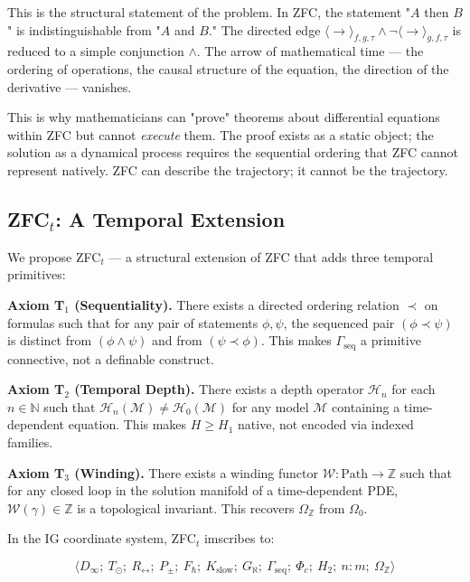 \documentclass[12pt,a4paper]{article}
\begin{document}
\begin{quote}
\end{quote}

This is the structural statement of the problem. In ZFC, the statement "$A$ then $B$" is indistinguishable from "$A$ and $B$." The directed edge $\langle\to\rangle_{f,g,\tau} \wedge \neg\langle\to\rangle_{g,f,\tau}$ is reduced to a simple conjunction $\wedge$. The arrow of mathematical time --- the ordering of operations, the causal structure of the equation, the direction of the derivative --- vanishes.

This is why mathematicians can "prove" theorems about differential equations within ZFC but cannot \emph{execute} them. The proof exists as a static object; the solution as a dynamical process requires the sequential ordering that ZFC cannot represent natively. ZFC can describe the trajectory; it cannot be the trajectory.

\subsection{ZFC$_t$: A Temporal Extension}

We propose ZFC$_t$ --- a structural extension of ZFC that adds three temporal primitives:

\textbf{Axiom T$_1$ (Sequentiality).} There exists a directed ordering relation $\prec$ on formulas such that for any pair of statements $\phi, \psi$, the sequenced pair $(\phi \prec \psi)$ is distinct from $(\phi \wedge \psi)$ and from $(\psi \prec \phi)$. This makes $\Gamma_\text{seq}$ a primitive connective, not a definable construct.

\textbf{Axiom T$_2$ (Temporal Depth).} There exists a depth operator $\mathcal{H}_n$ for each $n \in \mathbb{N}$ such that $\mathcal{H}_n(\mathcal{M}) \neq \mathcal{H}_0(\mathcal{M})$ for any model $\mathcal{M}$ containing a time-dependent equation. This makes $H \geq H_1$ native, not encoded via indexed families.

\textbf{Axiom T$_3$ (Winding).} There exists a winding functor $\mathcal{W}: \text{Path} \to \mathbb{Z}$ such that for any closed loop in the solution manifold of a time-dependent PDE, $\mathcal{W}(\gamma) \in \mathbb{Z}$ is a topological invariant. This recovers $\Omega_\mathbb{Z}$ from $\Omega_0$.

In the IG coordinate system, ZFC$_t$ imscribes to:

\[\langle D_{\infty};\ T_{\odot};\ R_{\leftrightarrow};\ P_{\pm};\ F_{\hbar};\ K_\text{slow};\ G_{\aleph};\ \Gamma_\text{seq};\ \Phi_c;\ H_2;\ n{:}m;\ \Omega_\mathbb{Z} \rangle\]
\end{document}

